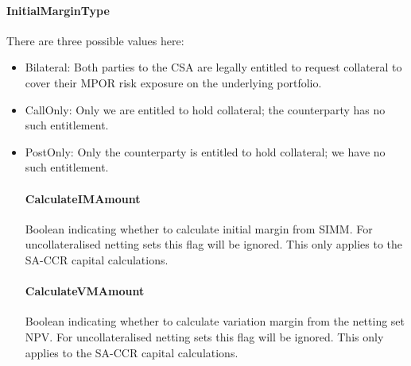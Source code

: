 \paragraph*{InitialMarginType} There are three possible values here:
\begin{itemize}
\item Bilateral: Both parties to the CSA are legally entitled to
  request collateral to cover their MPOR risk exposure
  on the underlying portfolio.
\item CallOnly: Only we are entitled to hold collateral; the
  counterparty has no such entitlement.
\item PostOnly: Only the counterparty is entitled to hold collateral;
  we have no such entitlement.

\paragraph*{CalculateIMAmount} Boolean indicating whether to calculate
  initial margin from SIMM. For uncollateralised netting sets
  this flag will be ignored. This only applies to the SA-CCR capital
  calculations.

\paragraph*{CalculateVMAmount} Boolean indicating whether to calculate
  variation margin from the netting set NPV. For uncollateralised netting
  sets this flag will be ignored. This only applies to the SA-CCR capital
  calculations.
\end{itemize}